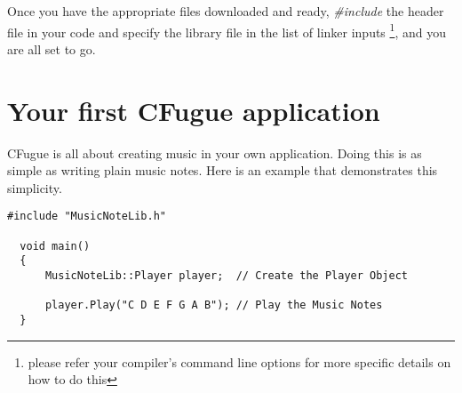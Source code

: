 Once you have the appropriate files downloaded and ready, \emph{\#include} the header file in your code and specify the library file in the list of linker inputs \footnote{please refer your compiler's command line options for more specific details on how to do this}, and you are all set to go.

\section{Your first CFugue application}
CFugue is all about creating music in your own application. Doing this is as simple as writing plain music notes. Here is an example that demonstrates this simplicity.
\begin{lstlisting}[frame=shadowbox,caption={Code to play middle octave},label=FirstApp]
  #include "MusicNoteLib.h"    
  
  void main()
  {      
      MusicNoteLib::Player player;  // Create the Player Object      
      
      player.Play("C D E F G A B"); // Play the Music Notes
  }
\end{lstlisting}